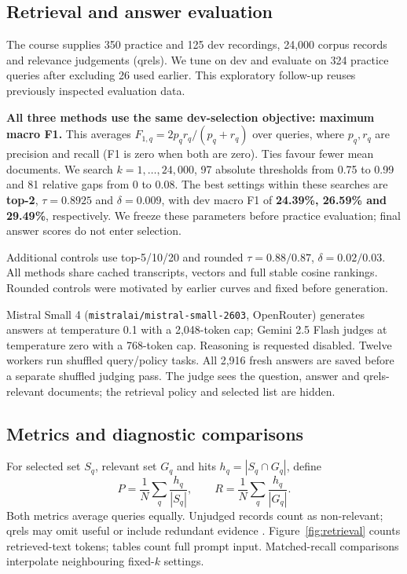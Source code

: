 \documentclass{article}
\begin{document}
\subsection{Retrieval and answer evaluation}
The course supplies 350 practice and 125 dev recordings, 24,000 corpus records and relevance judgements (qrels). We tune on dev and evaluate on 324 practice queries after excluding 26 used earlier. This exploratory follow-up reuses previously inspected evaluation data.

\textbf{All three methods use the same dev-selection objective: maximum macro F1.} This averages $F_{1,q}=2p_qr_q/(p_q+r_q)$ over queries, where $p_q,r_q$ are precision and recall (F1 is zero when both are zero). Ties favour fewer mean documents. We search $k=1,\ldots,24{,}000$, 97 absolute thresholds from 0.75 to 0.99 and 81 relative gaps from 0 to 0.08. The best settings within these searches are \textbf{top-2}, \textbf{$\tau=0.8925$} and \textbf{$\delta=0.009$}, with dev macro F1 of \textbf{24.39\%, 26.59\% and 29.49\%}, respectively. We freeze these parameters before practice evaluation; final answer scores do not enter selection.

Additional controls use top-5/10/20 and rounded $\tau=0.88/0.87$, $\delta=0.02/0.03$. All methods share cached transcripts, vectors and full stable cosine rankings. Rounded controls were motivated by earlier curves and fixed before generation.

Mistral Small 4 (\texttt{mistralai/mistral-small-2603}, OpenRouter) generates answers at temperature 0.1 with a 2,048-token cap; Gemini 2.5 Flash judges at temperature zero with a 768-token cap. Reasoning is requested disabled. Twelve workers run shuffled query/policy tasks. All 2,916 fresh answers are saved before a separate shuffled judging pass. The judge sees the question, answer and qrels-relevant documents; the retrieval policy and selected list are hidden.

\subsection{Metrics and diagnostic comparisons}
For selected set $S_q$, relevant set $G_q$ and hits $h_q=|S_q\cap G_q|$, define
\begin{equation}
 P=\frac1N\sum_q\frac{h_q}{|S_q|},\qquad
 R=\frac1N\sum_q\frac{h_q}{|G_q|}.
\end{equation}
Both metrics average queries equally. Unjudged records count as non-relevant; qrels may omit useful or include redundant evidence \citep{joren2025}. Figure~\ref{fig:retrieval} counts retrieved-text tokens; tables count full prompt input. Matched-recall comparisons interpolate neighbouring fixed-$k$ settings.
\end{document}
